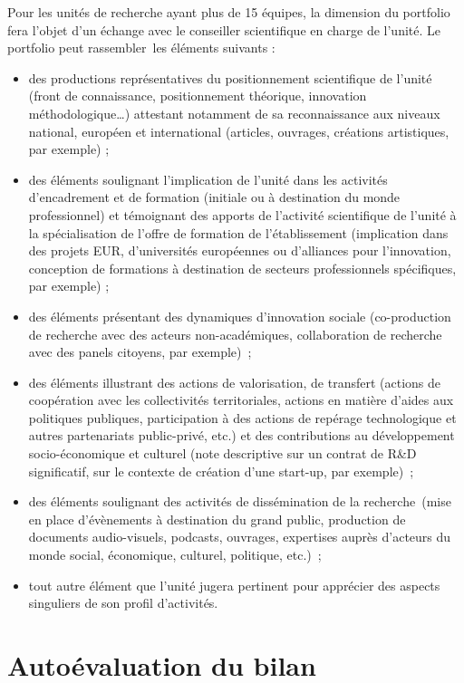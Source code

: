 \documentclass[]{article}
\begin{document}
{Pour les unités de recherche ayant plus de 15 équipes, la dimension du portfolio fera l’objet d’un échange avec le conseiller scientifique en charge de l’unité.
Le portfolio peut rassembler les éléments suivants :
\begin{itemize}
\item  des productions représentatives du positionnement scientifique de l’unité (front de connaissance, positionnement théorique, innovation méthodologique…) attestant notamment de sa reconnaissance aux niveaux national, européen et international (articles, ouvrages, créations artistiques, par exemple) ;
\item  des éléments soulignant l’implication de l’unité dans les activités d’encadrement et de formation (initiale ou à destination du monde professionnel) et témoignant des apports de l’activité scientifique de l’unité à la spécialisation de l’offre de formation de l’établissement (implication dans des projets EUR, d’universités européennes ou d’alliances pour l’innovation, conception de formations à destination de secteurs professionnels spécifiques, par exemple) ;
\item  des éléments présentant des dynamiques d’innovation sociale (co-production de recherche avec des acteurs non-académiques, collaboration de recherche avec des panels citoyens, par exemple) ;
\item  des éléments illustrant des actions de valorisation, de transfert (actions de coopération avec les collectivités territoriales, actions en matière d’aides aux politiques publiques, participation à des actions de repérage technologique et autres partenariats public-privé, etc.) et des contributions au développement socio-économique et culturel (note descriptive sur un contrat de R\&D significatif, sur le contexte de création d’une start-up, par exemple) ;
\item  des éléments soulignant des activités de dissémination de la recherche (mise en place d’évènements à destination du grand public, production de documents audio-visuels, podcasts, ouvrages, expertises auprès d’acteurs du monde social, économique, culturel, politique, etc.) ;
\item  tout autre élément que l’unité jugera pertinent pour apprécier des aspects singuliers de son profil d’activités.
\end{itemize}
}

\section{Autoévaluation du bilan}
\end{document}
